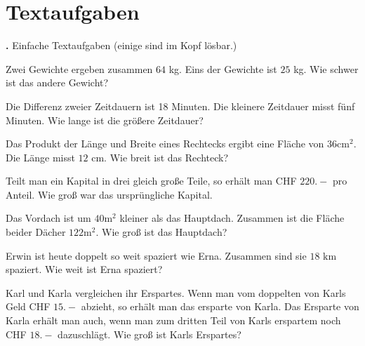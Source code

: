 \platzFuerBerechnungenBisEndeSeite{}
\newpage

\section{Textaufgaben}

\textbf{\bbwAufgabenNummer{}.}
Einfache Textaufgaben (einige sind im Kopf lösbar.)

\begin{bbwAufgabenBlock}
\item Zwei Gewichte ergeben zusammen $64$ kg. Eins der Gewichte ist
$25$ kg. Wie schwer ist das andere Gewicht?


\item Die Differenz zweier Zeitdauern ist 18 Minuten. Die kleinere
Zeitdauer misst fünf Minuten. Wie lange ist die größere Zeitdauer?


\item Das Produkt der Länge und Breite eines Rechtecks ergibt eine
Fläche von $36 \text{cm}^2$. Die Länge misst $12$ cm. Wie breit ist
das Rechteck?



\item Teilt man ein Kapital in drei gleich große Teile, so erhält man
CHF $220.-$ pro Anteil. Wie groß war das ursprüngliche Kapital.


\item Das Vordach ist um $40 \text{m}^2$ kleiner als das
Hauptdach. Zusammen ist die Fläche beider Dächer $122 \text{m}^2$. Wie
groß ist das Hauptdach?

\noTRAINER{\newpage}

\item Erwin ist heute doppelt so weit spaziert wie Erna. Zusammen sind
sie $18 \text{ km}$ spaziert. Wie weit ist Erna spaziert?


\item Karl und Karla vergleichen ihr Erspartes. Wenn man vom doppelten
von Karls Geld CHF $15.-$ abzieht, so erhält man das ersparte von
Karla. Das Ersparte von Karla erhält man auch, wenn man zum dritten
Teil von Karls erspartem noch CHF $18.-$ dazuschlägt. Wie groß ist
Karls Erspartes?


\end{bbwAufgabenBlock}
